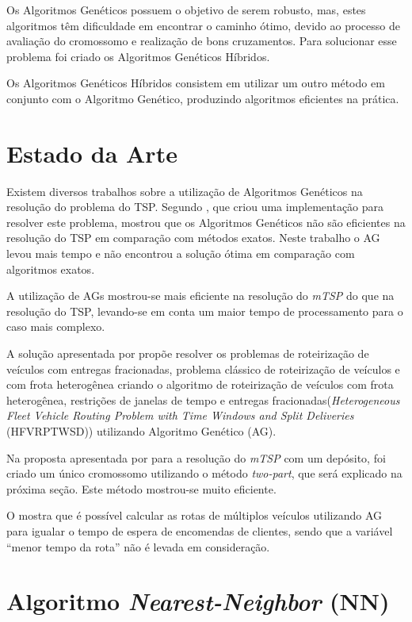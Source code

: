 \documentclass{abnt}
\begin{document}
			Os Algoritmos  Genéticos possuem o objetivo de serem robusto, mas, estes algoritmos têm dificuldade em encontrar o caminho ótimo, devido ao processo de avaliação do cromossomo e realização de bons cruzamentos. 
			Para solucionar esse problema foi criado os Algoritmos Genéticos Híbridos.

			Os Algoritmos Genéticos Híbridos consistem em utilizar um outro método em conjunto com o Algoritmo Genético, produzindo algoritmos eficientes na prática.
			
			\chapter{Estado da Arte}
		
			Existem diversos trabalhos sobre a utilização de Algoritmos Genéticos na resolução do problema do TSP.
			Segundo , que criou uma implementação para resolver este problema, mostrou que os Algoritmos Genéticos não são eficientes 
			na resolução do TSP em comparação com métodos exatos. Neste trabalho o AG levou mais tempo e não encontrou a solução ótima em comparação com 
			algoritmos exatos.

			A utilização de AGs mostrou-se mais eficiente na resolução do \textit{mTSP} do que na resolução do TSP,  
			levando-se em conta um maior tempo de processamento para o caso mais complexo.

			A solução apresentada por  propõe resolver os problemas de roteirização de 
			veículos com entregas fracionadas, problema clássico de roteirização de veículos e com 
			frota heterogênea criando o algoritmo de roteirização de veículos com frota heterogênea, 
			restrições de janelas de tempo e entregas fracionadas(\textit{Heterogeneous Fleet Vehicle 
			Routing Problem with Time Windows and Split Deliveries} (HFVRPTWSD)) utilizando Algoritmo 
			Genético (AG).

			Na proposta  apresentada por  para a resolução do \textit{mTSP} com um depósito, foi criado um único cromossomo utilizando o método \textit{two-part}, que será explicado na próxima seção. Este método mostrou-se muito eficiente.

			O   mostra que é possível calcular as rotas de múltiplos veículos utilizando AG para igualar o tempo 
			de espera de encomendas de clientes, sendo que a variável ``menor tempo da rota'' não é levada em consideração.


		\chapter{Algoritmo \textit{Nearest-Neighbor} (NN)}
\end{document}
